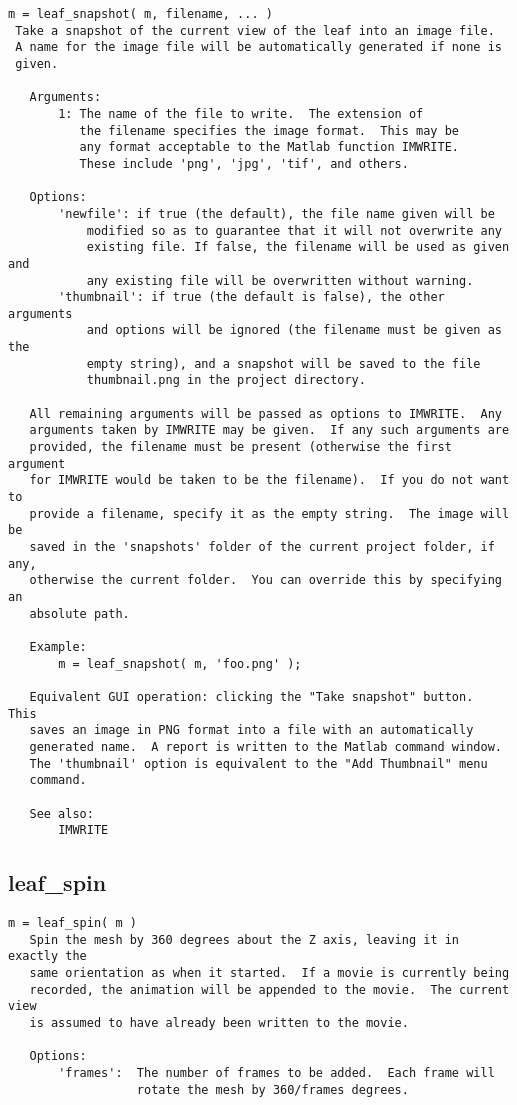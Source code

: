 \begin{verbatim}
m = leaf_snapshot( m, filename, ... )
 Take a snapshot of the current view of the leaf into an image file.
 A name for the image file will be automatically generated if none is
 given.

   Arguments:
       1: The name of the file to write.  The extension of
          the filename specifies the image format.  This may be
          any format acceptable to the Matlab function IMWRITE.
          These include 'png', 'jpg', 'tif', and others.

   Options:
       'newfile': if true (the default), the file name given will be
           modified so as to guarantee that it will not overwrite any
           existing file. If false, the filename will be used as given and
           any existing file will be overwritten without warning.
       'thumbnail': if true (the default is false), the other arguments
           and options will be ignored (the filename must be given as the
           empty string), and a snapshot will be saved to the file
           thumbnail.png in the project directory.

   All remaining arguments will be passed as options to IMWRITE.  Any
   arguments taken by IMWRITE may be given.  If any such arguments are
   provided, the filename must be present (otherwise the first argument
   for IMWRITE would be taken to be the filename).  If you do not want to
   provide a filename, specify it as the empty string.  The image will be
   saved in the 'snapshots' folder of the current project folder, if any,
   otherwise the current folder.  You can override this by specifying an
   absolute path.

   Example:
       m = leaf_snapshot( m, 'foo.png' );

   Equivalent GUI operation: clicking the "Take snapshot" button.  This
   saves an image in PNG format into a file with an automatically
   generated name.  A report is written to the Matlab command window.
   The 'thumbnail' option is equivalent to the "Add Thumbnail" menu
   command.

   See also:
       IMWRITE
\end{verbatim}

\subsection{leaf\_spin}\label{section-leaf-spin}

\begin{verbatim}
m = leaf_spin( m )
   Spin the mesh by 360 degrees about the Z axis, leaving it in exactly the
   same orientation as when it started.  If a movie is currently being
   recorded, the animation will be appended to the movie.  The current view
   is assumed to have already been written to the movie.

   Options:
       'frames':  The number of frames to be added.  Each frame will
                  rotate the mesh by 360/frames degrees.
\end{verbatim}

